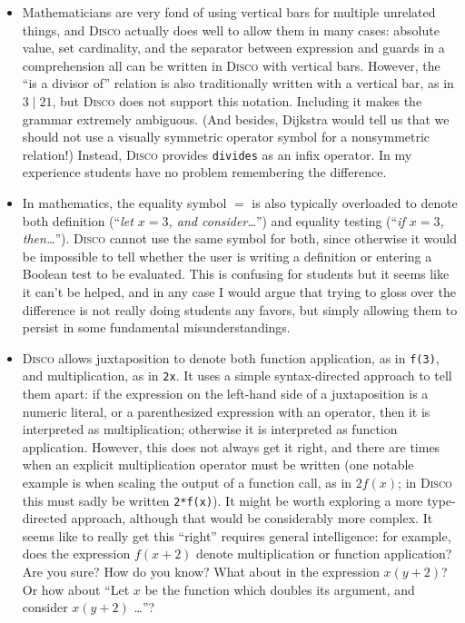 \documentclass[submission,copyright,creativecommons]{eptcs}
\newcommand{\disco}{\textsc{Disco}\xspace}
\begin{document}
\begin{itemize}
\item Mathematicians are very fond of using vertical bars for multiple
  unrelated things, and \disco actually does well to allow them in
  many cases: absolute value, set cardinality, and the separator
  between expression and guards in a comprehension all can be written
  in \disco with vertical bars.  However, the ``is a divisor of''
  relation is also traditionally written with a vertical bar, as in
  $3 \mid 21$, but \disco does not support this notation.  Including
  it makes the grammar extremely ambiguous.  (And besides, Dijkstra
  would tell us that we should not use a visually symmetric operator
  symbol for a nonsymmetric relation!) Instead, \disco provides
  \texttt{divides} as an infix operator.  In my experience students
  have no problem remembering the difference.
\item In mathematics, the equality symbol $=$ is also typically
  overloaded to denote both definition (``\emph{let $x = 3$, and
    consider\dots}'') and equality testing (``\emph{if $x = 3$,
    then\dots}'').  \disco cannot use the same symbol for both, since
  otherwise it would be impossible to tell whether the user is writing
  a definition or entering a Boolean test to be evaluated.  This is
  confusing for students but it seems like it can't be helped, and in
  any case I would argue that trying to gloss over the difference is
  not really doing students any favors, but simply allowing them to
  persist in some fundamental misunderstandings.
\item \disco allows juxtaposition to denote both function application,
  as in \texttt{f(3)}, and multiplication, as in \texttt{2x}.  It uses
  a simple syntax-directed approach to tell them apart: if the
  expression on the left-hand side of a juxtaposition is a numeric
  literal, or a parenthesized expression with an operator, then it is
  interpreted as multiplication; otherwise it is interpreted as
  function application.  However, this does not always get it right,
  and there are times when an explicit multiplication operator must be
  written (one notable example is when scaling the output of a
  function call, as in $2f(x)$; in \disco this must sadly be written
  \texttt{2*f(x)}).  It might be worth exploring a more
  type-directed approach, although that would be considerably more
  complex.  It seems like to really get this ``right'' requires
  general intelligence: for example, does the expression $f(x+2)$
  denote multiplication or function application?  Are you sure?  How
  do you know?  What about in the expression $x(y+2)$?  Or how about
  ``Let $x$ be the function which doubles its argument, and consider
  $x(y+2)$ \dots''?
\end{itemize}
\end{document}
